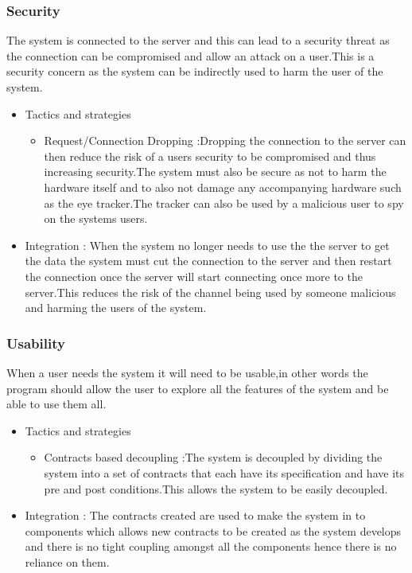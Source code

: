 \subsubsection{Security}	
\begin{flushleft}
The system is connected to the server and this can lead to a security threat as the connection can be compromised and allow an attack on a user.This is a security concern as the system can be indirectly used to harm the user of the system.
\begin{itemize}
\item{Tactics and strategies}
\begin{itemize}
\item{Request/Connection Dropping} :Dropping the connection to the server can then reduce the risk of a users security to be compromised and thus increasing security.The system must also be secure as not to harm the hardware itself and to also not damage any accompanying hardware such as the eye tracker.The tracker can also be used by a malicious user to spy on the systems users.

\end{itemize}

\item{Integration} :
When the system no longer needs to use the the server to get the data the system must cut the connection to the server and then restart the connection once the server will start connecting once more to the server.This reduces the risk of the channel being used by someone malicious and harming the users of the system.
\end{itemize}

\end{flushleft}	

\subsubsection{Usability}
\begin{flushleft}
When a user needs the system it will need to be usable,in other words the program should allow the user to explore all the features of the system and be able to use them all.
\begin{itemize}
\item{Tactics and strategies}
\begin{itemize}
\item{Contracts based decoupling} :The system is decoupled by dividing the system into a set of contracts that each have its specification and have its pre and post conditions.This allows the system to be easily decoupled.

\end{itemize}

\item{Integration} :
The contracts created are used to make the system in to components which allows new contracts to be created as the system develops and there is no tight coupling amongst all the components hence there is no reliance on them.
\end{itemize}

\end{flushleft}
		
